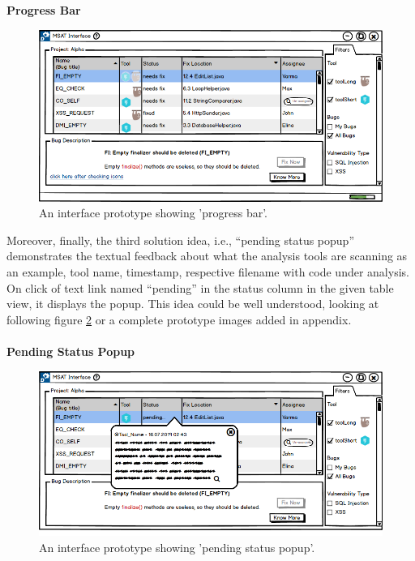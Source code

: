 \textbf{Progress Bar}
\begin{figure}[hbt!]
	\centering
	\includegraphics[width=\linewidth]{figures/solution_ideas_snaps/S12_disabled_icons_progress_bar}
	\caption{An interface prototype showing 'progress bar'.}
	\label{fig:S12_disabled_icons_progress_bar}
\end{figure}


Moreover, finally, the third solution idea, i.e., “pending status popup” demonstrates the textual feedback about what the analysis tools are scanning as an example, tool name, timestamp, respective filename with code under analysis. On click of text link named “pending” in the status column in the given table view, it displays the popup. This idea could be well understood, looking at following figure \ref{fig:S12_pending_status_popup} or a complete prototype images added in appendix. \\ \\

\textbf{Pending Status Popup}
\begin{figure}[hbt!]
	\centering
	\includegraphics[width=\linewidth]{figures/solution_ideas_snaps/S12_pending_status_popup}
	\caption{An interface prototype showing 'pending status popup'.}
	\label{fig:S12_pending_status_popup}
\end{figure}


